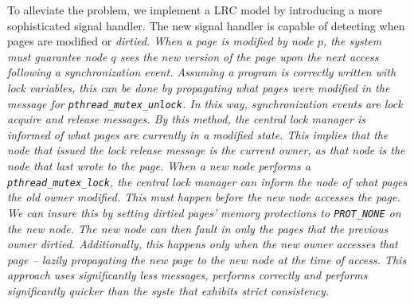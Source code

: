 To alleviate the problem, we implement a LRC model by introducing a more sophisticated signal handler.  The new signal handler is capable of detecting when pages are modified or \em dirtied\em.  When a page is modified by node $p$, the system must guarantee node $q$ sees the new version of the page upon the next access following a synchronization event.  Assuming a program is correctly written with lock variables, this can be done by propagating what pages were modified in the message for \verb,pthread_mutex_unlock,.  In this way, synchronization events are lock acquire and release messages.  By this method, the central lock manager is informed of what pages are currently in a modified state.  This implies that the node that issued the lock release message is the current owner, as that node is the node that last wrote to the page.  When a new node performs a \verb,pthread_mutex_lock,, the central lock manager can inform the node of what pages the old owner modified.  This must happen before the new node accesses the page.  We can insure this by setting dirtied pages' memory protections to \verb,PROT_NONE, on the new node.  The new node can then fault in only the pages that the previous owner dirtied.  Additionally, this happens only when the new owner accesses that page -- lazily propagating the new page to the new node at the time of access.  This approach uses significantly less messages, performs correctly and performs significantly quicker than the syste that exhibits \em strict consistency\em.






